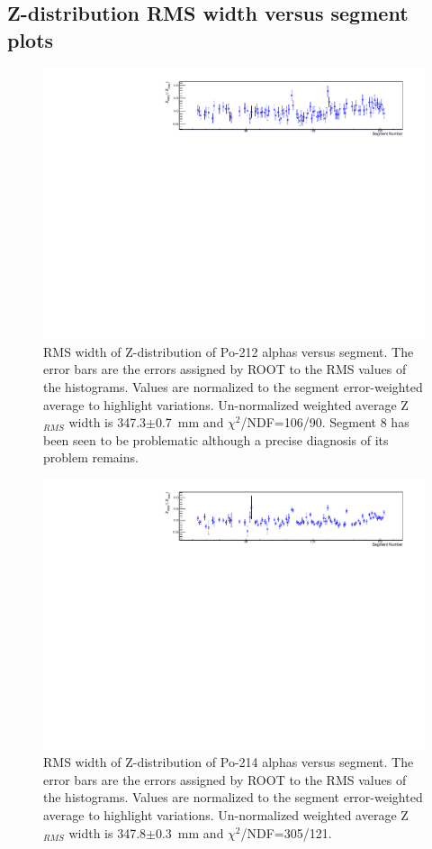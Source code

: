 \subsection{Z-distribution RMS width versus segment plots}
\begin{figure}[!h]
\centering
\includegraphics[width=1.05\textwidth]{figures/PubBiPo212ZRMSvsCell.pdf}
\caption{\label{fig:ZRMSvsCell212}RMS width of Z-distribution of Po-212 alphas versus segment. The error bars are the errors assigned by ROOT to the RMS values of the histograms. Values are normalized to the segment error-weighted average to highlight variations. Un-normalized weighted average Z$_{RMS}$ width is 347.3$\pm$0.7~mm and $\chi^2$/NDF=106/90. Segment 8 has been seen to be problematic although a precise diagnosis of its problem remains.}
\end{figure}
\begin{figure}[!h]
\centering
\includegraphics[width=1.05\textwidth]{figures/PubBiPo214ZRMSvsCell.pdf}
\caption{\label{fig:ZRMSvsCell214}RMS width of Z-distribution of Po-214 alphas versus segment. The error bars are the errors assigned by ROOT to the RMS values of the histograms. Values are normalized to the segment error-weighted average to highlight variations. Un-normalized weighted average Z$_{RMS}$ width is 347.8$\pm$0.3~mm and $\chi^2$/NDF=305/121.}
\end{figure}
\clearpage
\newpage
